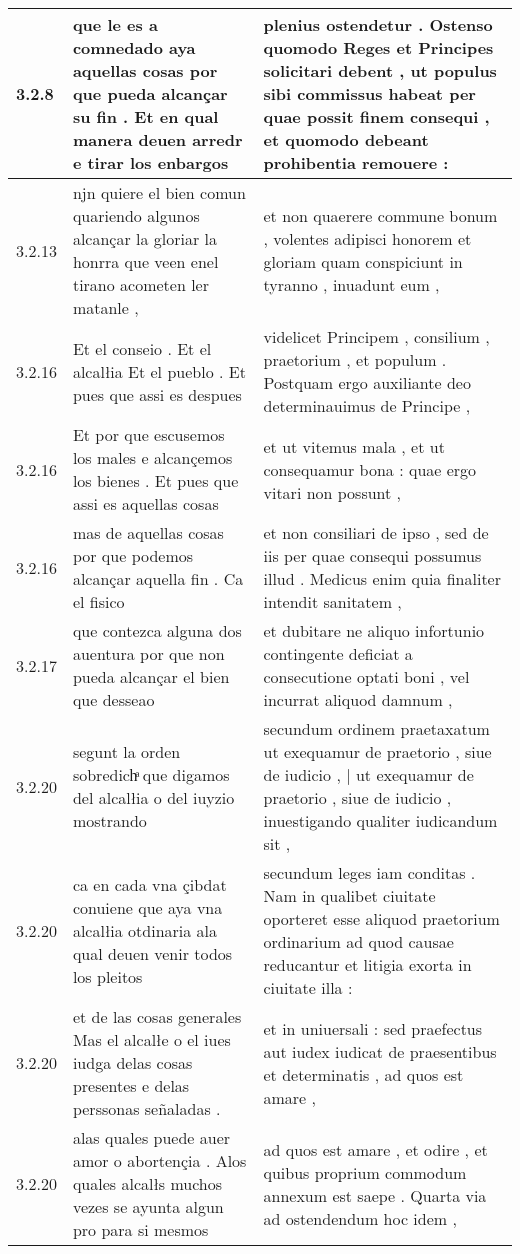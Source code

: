 \begin{tabular}{|p{1cm}|p{6.5cm}|p{6.5cm}|}
3.2.8 & que le es a comnedado aya aquellas cosas por que pueda alcançar su fin . Et en qual manera deuen arredr e tirar los enbargos & plenius ostendetur . Ostenso quomodo Reges et Principes solicitari debent , ut populus sibi commissus habeat per quae possit finem consequi , et quomodo debeant prohibentia remouere : \\\hline
3.2.13 & njn quiere el bien comun quariendo algunos alcançar la gloriar la honrra que veen enel tirano acometen ler matanle , & et non quaerere commune bonum , volentes adipisci honorem et gloriam quam conspiciunt in tyranno , inuadunt eum , \\\hline
3.2.16 & Et el conseio . Et el alcalłia Et el pueblo . Et pues que assi es despues & videlicet Principem , consilium , praetorium , et populum . Postquam ergo auxiliante deo determinauimus de Principe , \\\hline
3.2.16 & Et por que escusemos los males e alcançemos los bienes . Et pues que assi es aquellas cosas & et ut vitemus mala , et ut consequamur bona : quae ergo vitari non possunt , \\\hline
3.2.16 & mas de aquellas cosas por que podemos alcançar aquella fin . Ca el fisico & et non consiliari de ipso , sed de iis per quae consequi possumus illud . Medicus enim quia finaliter intendit sanitatem , \\\hline
3.2.17 & que contezca alguna dos auentura por que non pueda alcançar el bien que desseao & et dubitare ne aliquo infortunio contingente deficiat a consecutione optati boni , vel incurrat aliquod damnum , \\\hline
3.2.20 & segunt la orden sobredichͣ que digamos del alcalłia o del iuyzio mostrando & secundum ordinem praetaxatum ut exequamur de praetorio , siue de iudicio , | ut exequamur de praetorio , siue de iudicio , inuestigando qualiter iudicandum sit , \\\hline
3.2.20 & ca en cada vna çibdat conuiene que aya vna alcalłia otdinaria ala qual deuen venir todos los pleitos & secundum leges iam conditas . Nam in qualibet ciuitate oporteret esse aliquod praetorium ordinarium ad quod causae reducantur et litigia exorta in ciuitate illa : \\\hline
3.2.20 & et de las cosas generales Mas el alcalłe o el iues iudga delas cosas presentes e delas perssonas señaladas . & et in uniuersali : sed praefectus aut iudex iudicat de praesentibus et determinatis , ad quos est amare , \\\hline
3.2.20 & alas quales puede auer amor o abortençia . Alos quales alcalłs muchos vezes se ayunta algun pro para si mesmos & ad quos est amare , et odire , et quibus proprium commodum annexum est saepe . Quarta via ad ostendendum hoc idem , \\\hline

\end{tabular}
